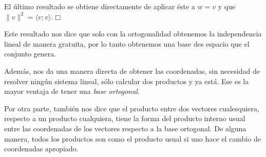 \documentclass[12pt]{book}
\begin{document}
{{     El último resultado se obtiene directamente de aplicar éste a $w=v$ y que  $\|v\|^2=\langle v;v\rangle$.\hfill $\Box$
    }
     

    Este resultado nos dice que solo con la ortogonalidad obtenemos la independencia lineal de manera gratuita, por lo tanto obtenemos una base des espacio que el conjunto genera.

    Además, nos da una manera directa de obtener las coordenadas, sin necesidad de resolver ningún sistema lineal, sólo calcular dos productos y ya está.
    Ese es la mayor ventaja de tener una \emph{base ortogonal}.

    Por otra parte, también nos dice que el producto entre dos vectores cualesquiera, respecto a un producto cualquiera, tiene la forma del producto interno usual entre las coordenadas de los vectores respecto a la base ortogonal. De alguna manera, todos los productos son como el producto usual si uno hace el cambio de coordenadas apropiado.

}
\end{document}
